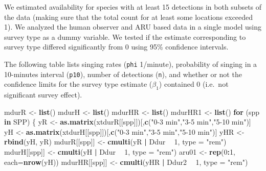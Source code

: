 \documentclass[12pt,]{book}
\newenvironment{Shaded}{\begin{snugshade}}{\end{snugshade}}
\newcommand{\ControlFlowTok}[1]{\textcolor[rgb]{0.13,0.29,0.53}{\textbf{#1}}}
\newcommand{\DataTypeTok}[1]{\textcolor[rgb]{0.13,0.29,0.53}{#1}}
\newcommand{\DecValTok}[1]{\textcolor[rgb]{0.00,0.00,0.81}{#1}}
\newcommand{\KeywordTok}[1]{\textcolor[rgb]{0.13,0.29,0.53}{\textbf{#1}}}
\newcommand{\NormalTok}[1]{#1}
\newcommand{\OperatorTok}[1]{\textcolor[rgb]{0.81,0.36,0.00}{\textbf{#1}}}
\newcommand{\StringTok}[1]{\textcolor[rgb]{0.31,0.60,0.02}{#1}}
\begin{document}
We estimated availability for species with at least 15 detections
in both subsets of the data (making sure that the total count for at least
some locations exceeded 1). We analyzed the human observer and ARU based data
in a single model using survey type as a dummy variable.
We tested if the estimate corresponding to survey type differed significantly
from 0 using 95\% confidence intervals.

The following table lists singing rates (\texttt{phi} 1/minute), probability of
singing in a 10-minutes interval (\texttt{p10}), number of detections (\texttt{n}),
and whether or not the confidence limits for the survey type estimate
(\(\beta_1\)) contained 0 (i.e.~not significant survey effect).

\begin{Shaded}
\begin{Highlighting}[]
\NormalTok{mdurR <-}\StringTok{ }\KeywordTok{list}\NormalTok{()}
\NormalTok{mdurH <-}\StringTok{ }\KeywordTok{list}\NormalTok{()}
\NormalTok{mdurHR <-}\StringTok{ }\KeywordTok{list}\NormalTok{()}
\NormalTok{mdurHR1 <-}\StringTok{ }\KeywordTok{list}\NormalTok{()}
\ControlFlowTok{for}\NormalTok{ (spp }\ControlFlowTok{in}\NormalTok{ SPP) \{}
\NormalTok{    yR <-}\StringTok{ }\KeywordTok{as.matrix}\NormalTok{(xtdurR[[spp]])[,}\KeywordTok{c}\NormalTok{(}\StringTok{"0-3 min"}\NormalTok{,}\StringTok{"3-5 min"}\NormalTok{,}\StringTok{"5-10 min"}\NormalTok{)]}
\NormalTok{    yH <-}\StringTok{ }\KeywordTok{as.matrix}\NormalTok{(xtdurH[[spp]])[,}\KeywordTok{c}\NormalTok{(}\StringTok{"0-3 min"}\NormalTok{,}\StringTok{"3-5 min"}\NormalTok{,}\StringTok{"5-10 min"}\NormalTok{)]}
\NormalTok{    yHR <-}\StringTok{ }\KeywordTok{rbind}\NormalTok{(yH, yR)}
\NormalTok{    mdurR[[spp]] <-}\StringTok{ }\KeywordTok{cmulti}\NormalTok{(yR }\OperatorTok{|}\StringTok{ }\NormalTok{Ddur }\OperatorTok{~}\StringTok{ }\DecValTok{1}\NormalTok{, }\DataTypeTok{type =} \StringTok{"rem"}\NormalTok{)}
\NormalTok{    mdurH[[spp]] <-}\StringTok{ }\KeywordTok{cmulti}\NormalTok{(yH }\OperatorTok{|}\StringTok{ }\NormalTok{Ddur }\OperatorTok{~}\StringTok{ }\DecValTok{1}\NormalTok{, }\DataTypeTok{type =} \StringTok{"rem"}\NormalTok{)}
\NormalTok{    aru01 <-}\StringTok{ }\KeywordTok{rep}\NormalTok{(}\DecValTok{0}\OperatorTok{:}\DecValTok{1}\NormalTok{, }\DataTypeTok{each=}\KeywordTok{nrow}\NormalTok{(yH))}
\NormalTok{    mdurHR[[spp]] <-}\StringTok{ }\KeywordTok{cmulti}\NormalTok{(yHR }\OperatorTok{|}\StringTok{ }\NormalTok{Ddur2 }\OperatorTok{~}\StringTok{ }\DecValTok{1}\NormalTok{, }\DataTypeTok{type =} \StringTok{"rem"}\NormalTok{)}

\end{Highlighting}
\end{Shaded}
\end{document}
